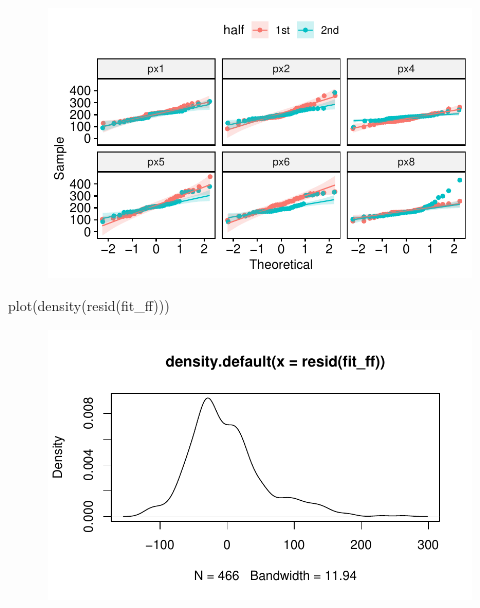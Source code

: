 \documentclass[
  letterpaper,
  DIV=11,
  numbers=noendperiod]{scrartcl}
\newenvironment{Shaded}{\begin{snugshade}}{\end{snugshade}}
\newcommand{\FunctionTok}[1]{\textcolor[rgb]{0.28,0.35,0.67}{#1}}
\newcommand{\NormalTok}[1]{\textcolor[rgb]{0.00,0.23,0.31}{#1}}
\begin{document}
\begin{figure}[H]

{\centering \includegraphics{_lin_reg1_files/figure-pdf/unnamed-chunk-32-1.pdf}

}

\end{figure}

\begin{Shaded}
\begin{Highlighting}[]
\FunctionTok{plot}\NormalTok{(}\FunctionTok{density}\NormalTok{(}\FunctionTok{resid}\NormalTok{(fit\_ff)))}
\end{Highlighting}
\end{Shaded}

\begin{figure}[H]

{\centering \includegraphics{_lin_reg1_files/figure-pdf/unnamed-chunk-33-1.pdf}

}

\end{figure}
\end{document}
